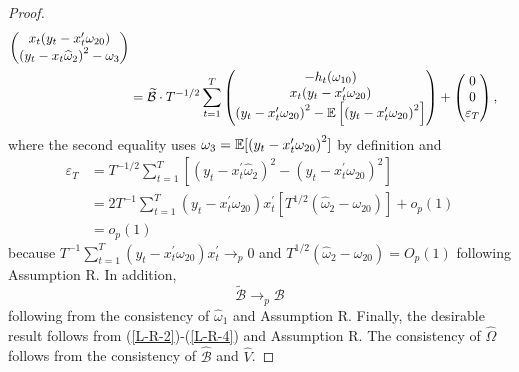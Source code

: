 \documentclass[11pt, letterpaper, twoside]{article}
\begin{document}
\begin{appendices}
\begin{proof}
\begin{align}
\begin{pmatrix}
%
        x_{t}(y_{t}-x_{t}^{\prime }\omega _{20}) \\ 
%
        \left( y_{t}-x_{t}\widehat{\omega }_{2}\right) ^{2}-\omega _{3}%
    \end{pmatrix}  \nonumber \\
%
    &=
%
    \widetilde{\mathcal{B}}\cdot T^{-1/2}\sum_{t=1}^{T} 
%
    \begin{pmatrix}
        -h_{t}(\omega _{10}) \\ 
%
        x_{t}(y_{t}-x_{t}^{\prime }\omega _{20}) \\ 
%
        \left( y_{t}-x_{t}^{\prime }\omega _{20}\right) ^{2}-\E\left[\left( y_{t}-x_{t}^{\prime }\omega _{20}\right)^{2}\right]%
%
    \end{pmatrix}%
%
    +
%
    \begin{pmatrix}
        0 \\ 
        0 \\ 
        \varepsilon_{T}
    \end{pmatrix},
%
    \label{L-R-2}
%
\end{align}%
%
where the second equality uses $\omega _{3}=\operatorname{\mathbb{E}}[\left( y_{t}-x_{t}^{\prime }\omega _{20}\right) ^{2}]$ by definition and 
%
\begin{align}
    \varepsilon _{T} 
%
    &= T^{-1/2}\sum_{t=1}^{T}\left[ \left( y_{t}-x_{t}^{\prime } \widehat{\omega }_{2}\right) ^{2}-\left( y_{t}-x_{t}^{\prime }\omega _{20}\right) ^{2}\right]  \nonumber \\
%
    &= 2T^{-1}\sum_{t=1}^{T}\left( y_{t}-x_{t}^{\prime }\omega _{20}\right) x_{t}^{\prime }\left[ T^{1/2}\left( \widehat{\omega }_{2}-\omega _{20}\right) \right] +o_{p}(1)  \nonumber \\
%
    &= o_{p}(1)  
%
    \label{L-R-3}
\end{align}
%
because $T^{-1}\sum_{t=1}^{T}\left( y_{t}-x_{t}^{\prime }\omega _{20}\right) x_{t}^{\prime }\rightarrow _{p}0$ and $T^{1/2}(\widehat{\omega }_{2}-\omega _{20})=O_{p}(1)$ following Assumption R. 
In addition, 
%
\begin{equation}
    \widetilde{\mathcal{B}}\rightarrow _{p}\mathcal{B}  
    \label{L-R-4}
\end{equation}%
%
following from the consistency of $\widehat{\omega }_{1}$ and Assumption R.
Finally, the desirable result follows from (\ref{L-R-2})-(\ref{L-R-4}) and Assumption R. 
The consistency of $\widehat{\Omega }$ follows from the consistency of $\widehat{\mathcal{B}}$ and $\widehat{V}$. 

\end{proof}


\end{appendices}
\end{document}
